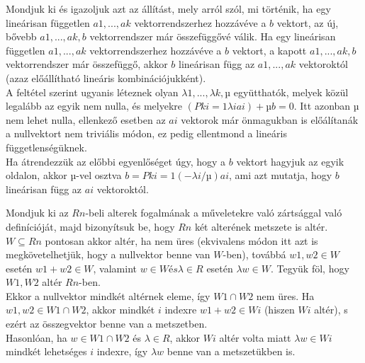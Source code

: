 \begin{frame}
  \begin{tcolorbox}[title={3. (4p)}]
      Mondjuk ki és igazoljuk azt az állítást, mely arról szól, mi történik, ha egy lineárisan független $a1,...,ak$ vektorrendszerhez hozzávéve a $b$ vektort, az új, bővebb $a1,...,ak,b$ vektorrendszer már összefüggővé válik.
  \tcblower
    Ha egy lineárisan független $a1,...,ak$ vektorrendszerhez hozzávéve a $b$ vektort, a kapott $a1,...,ak,b$ vektorrendszer már összefüggő, akkor $b$ lineárisan függ az $a1,...,ak$ vektoroktól (azaz előállítható lineáris kombinációjukként).\\
    
    A feltétel szerint ugyanis léteznek olyan $λ1,...,λk,µ$ együtthatók, melyek közül legalább az egyik nem nulla, és melyekre $(Pk i=1 λiai) + µb = 0$. Itt azonban $µ$ nem lehet nulla, ellenkező esetben az $ai$ vektorok már önmagukban is előálítanák a nullvektort nem triviális módon, ez pedig ellentmond a lineáris függetlenségüknek.\\
    
    Ha átrendezzük az előbbi egyenlőséget úgy, hogy a $b$ vektort hagyjuk az egyik oldalon, akkor $µ$-vel osztva $b = Pk i=1(−λi/µ)ai$, ami azt mutatja, hogy $b$ lineárisan függ az $ai$ vektoroktól.
  \end{tcolorbox}
\end{frame}

\begin{frame}
  \begin{tcolorbox}[title={4. (4p)}]
      Mondjuk ki az $Rn$-beli alterek fogalmának a műveletekre való zártsággal való deﬁnícióját, majd bizonyítsuk be, hogy $Rn$ két alterének metszete is altér.
  \tcblower
    $W ⊆ Rn$ pontosan akkor altér, ha nem üres (ekvivalens módon itt azt is megkövetelhetjük, hogy a nullvektor benne van $W$-ben), továbbá $w1,w2 ∈ W$ esetén $w1 +w2 ∈ W$, valamint $w ∈ W és λ ∈ R$ esetén $λw ∈ W$. Tegyük föl, hogy $W1,W2$ altér $Rn$-ben.\\
    
    Ekkor a nullvektor mindkét altérnek eleme, így $W1 ∩W2$ nem üres. Ha $w1,w2 ∈ W1 ∩W2$, akkor mindkét $i$ indexre $w1 +w2 ∈ Wi$ (hiszen $Wi$ altér), s ezért az összegvektor benne van a metszetben.\\
    
    Hasonlóan, ha $w ∈ W1 ∩ W2$ és $λ ∈ R$, akkor $Wi$ altér volta miatt $λw ∈ Wi$ mindkét lehetséges $i$ indexre, így $λw$ benne van a metszetükben is.
  \end{tcolorbox}
\end{frame}


